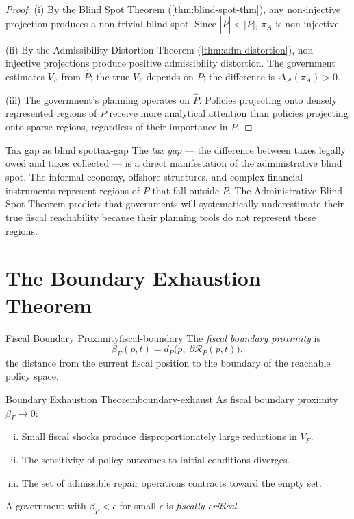 \documentclass[12pt,twoside,openright]{book}
\newcommand{\reach}{\mathcal{R}}
\newcommand{\adm}{\mathcal{A}}
\begin{document}
\begin{proof}
  (i) By the Blind Spot Theorem
  (\cref{thm:blind-spot-thm}), any non-injective
  projection produces a non-trivial blind spot.
  Since $|\hat{P}| < |P|$, $\pi_A$ is non-injective.

  (ii) By the Admissibility Distortion Theorem
  (\cref{thm:adm-distortion}), non-injective projections
  produce positive admissibility distortion.
  The government estimates $V_F$ from $\hat{P}$;
  the true $V_F$ depends on $P$;
  the difference is $\Delta_\adm(\pi_A) > 0$.

  (iii) The government's planning operates on $\hat{P}$.
  Policies projecting onto densely represented regions
  of $\hat{P}$ receive more analytical attention than
  policies projecting onto sparse regions,
  regardless of their importance in $P$.
\end{proof}

\begin{remark}{Tax gap as blind spot}{tax-gap}
  The \emph{tax gap} — the difference between taxes
  legally owed and taxes collected — is a direct
  manifestation of the administrative blind spot.
  The informal economy, offshore structures, and
  complex financial instruments represent regions of
  $P$ that fall outside $\hat{P}$.
  The Administrative Blind Spot Theorem predicts that
  governments will systematically underestimate their
  true fiscal reachability because their planning
  tools do not represent these regions.
\end{remark}

\section{The Boundary Exhaustion Theorem}

\begin{definition}{Fiscal Boundary Proximity}{fiscal-boundary}
  The \emph{fiscal boundary proximity} is
  \[
    \beta_F(p, t)
    = d_P\!\bigl(p,\; \partial\reach_P(p,t)\bigr),
  \]
  the distance from the current fiscal position to
  the boundary of the reachable policy space.
\end{definition}

\begin{theorem}{Boundary Exhaustion Theorem}{boundary-exhaust}
  As fiscal boundary proximity $\beta_F \to 0$:
  \begin{enumerate}[(i)]
    \item Small fiscal shocks produce disproportionately
          large reductions in $V_F$.
    \item The sensitivity of policy outcomes to initial
          conditions diverges.
    \item The set of admissible repair operations
          contracts toward the empty set.
  \end{enumerate}
  A government with $\beta_F < \epsilon$ for small
  $\epsilon$ is \emph{fiscally critical}.
\end{theorem}
\end{document}

